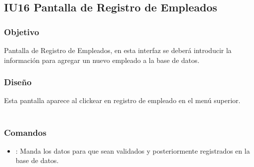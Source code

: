 \newpage
\subsection{IU16 Pantalla de Registro de Empleados}

\subsubsection{Objetivo}
	Pantalla de Registro de Empleados, en esta interfaz se deberá introducir la información para agregar un nuevo empleado a la base de datos.  

\subsubsection{Diseño}
	Esta pantalla aparece al clickear en registro de empleado en el menú superior.  \\\\



\subsubsection{Comandos}
\begin{itemize}
	\item {}: Manda los datos para que sean validados y posteriormente registrados en la base de datos. 
\end{itemize}


